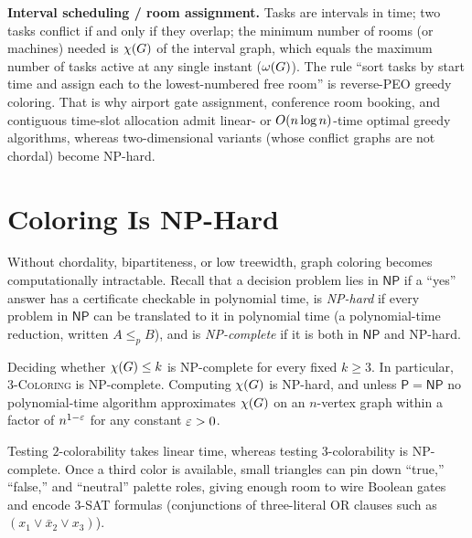 \begin{applicationbox}
\textbf{Interval scheduling / room assignment.} Tasks are intervals in time; two
tasks conflict if and only if they overlap; the minimum number of rooms (or machines) needed
is $\chi(G)$ of the interval graph, which equals the maximum number of tasks
active at any single instant ($\omega(G)$). The rule ``sort tasks by start time and assign each to the lowest-numbered free room'' is reverse-PEO greedy coloring. That is why airport gate
assignment, conference room booking, and contiguous time-slot allocation admit
linear- or $O(n\log n)$-time optimal greedy algorithms, whereas two-dimensional variants (whose conflict graphs are not chordal) become NP-hard.
\end{applicationbox}

\section{Coloring Is NP-Hard}
\label{ch28:nphard}

Without chordality, bipartiteness, or low treewidth, graph coloring becomes computationally intractable. Recall that a decision problem lies in $\mathsf{NP}$ if a ``yes'' answer has a certificate checkable in polynomial time, is \emph{NP-hard} if every problem in $\mathsf{NP}$ can be translated to it in polynomial time (a polynomial-time reduction, written $A\le_p B$), and is \emph{NP-complete} if it is both in $\mathsf{NP}$ and NP-hard.

\begin{theorem}
\label{ch28:thm-nphard}
Deciding whether $\chi(G)\le k$ is NP-complete for every fixed $k\ge 3$. In
particular, \textsc{3-Coloring} is NP-complete. Computing $\chi(G)$ is
NP-hard, and unless $\mathsf{P}=\mathsf{NP}$ no polynomial-time algorithm approximates
$\chi(G)$ on an $n$-vertex graph within a factor of $n^{1-\varepsilon}$ for any constant $\varepsilon>0$.
\end{theorem}

\begin{intuitionbox}
Testing $2$-colorability takes linear time, whereas testing $3$-colorability is NP-complete. Once a third color is available, small triangles can pin down ``true,'' ``false,'' and ``neutral'' palette roles, giving enough room to wire Boolean gates and encode \textsc{3-SAT} formulas (conjunctions of three-literal OR clauses such as $(x_1\lor \bar x_2\lor x_3)$).
\end{intuitionbox}

